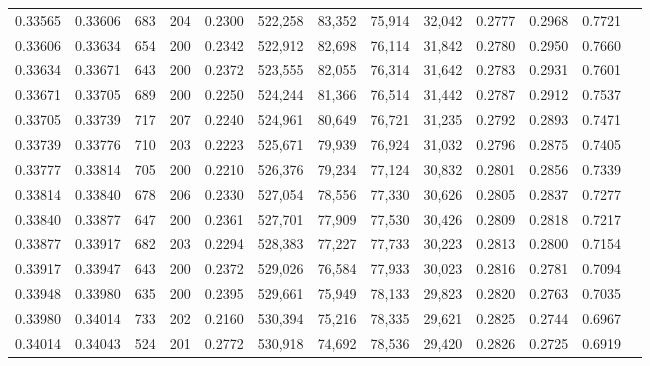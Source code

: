 \begin{tabular}{rrrrrrrrrrrrr}
0.33565 & 0.33606 &   683 & 204 &                                     0.2300 & 522,258 &  83,352 &  75,914 &  32,042 & 0.2777 & 0.2968 & 0.7721 \\
0.33606 & 0.33634 &   654 & 200 &                                     0.2342 & 522,912 &  82,698 &  76,114 &  31,842 & 0.2780 & 0.2950 & 0.7660 \\
0.33634 & 0.33671 &   643 & 200 &                                     0.2372 & 523,555 &  82,055 &  76,314 &  31,642 & 0.2783 & 0.2931 & 0.7601 \\
0.33671 & 0.33705 &   689 & 200 &                                     0.2250 & 524,244 &  81,366 &  76,514 &  31,442 & 0.2787 & 0.2912 & 0.7537 \\
0.33705 & 0.33739 &   717 & 207 &                                     0.2240 & 524,961 &  80,649 &  76,721 &  31,235 & 0.2792 & 0.2893 & 0.7471 \\
0.33739 & 0.33776 &   710 & 203 &                                     0.2223 & 525,671 &  79,939 &  76,924 &  31,032 & 0.2796 & 0.2875 & 0.7405 \\
0.33777 & 0.33814 &   705 & 200 &                                     0.2210 & 526,376 &  79,234 &  77,124 &  30,832 & 0.2801 & 0.2856 & 0.7339 \\
0.33814 & 0.33840 &   678 & 206 &                                     0.2330 & 527,054 &  78,556 &  77,330 &  30,626 & 0.2805 & 0.2837 & 0.7277 \\
0.33840 & 0.33877 &   647 & 200 &                                     0.2361 & 527,701 &  77,909 &  77,530 &  30,426 & 0.2809 & 0.2818 & 0.7217 \\
0.33877 & 0.33917 &   682 & 203 &                                     0.2294 & 528,383 &  77,227 &  77,733 &  30,223 & 0.2813 & 0.2800 & 0.7154 \\
0.33917 & 0.33947 &   643 & 200 &                                     0.2372 & 529,026 &  76,584 &  77,933 &  30,023 & 0.2816 & 0.2781 & 0.7094 \\
0.33948 & 0.33980 &   635 & 200 &                                     0.2395 & 529,661 &  75,949 &  78,133 &  29,823 & 0.2820 & 0.2763 & 0.7035 \\
0.33980 & 0.34014 &   733 & 202 &                                     0.2160 & 530,394 &  75,216 &  78,335 &  29,621 & 0.2825 & 0.2744 & 0.6967 \\
0.34014 & 0.34043 &   524 & 201 &                                     0.2772 & 530,918 &  74,692 &  78,536 &  29,420 & 0.2826 & 0.2725 & 0.6919 \\

\end{tabular}
